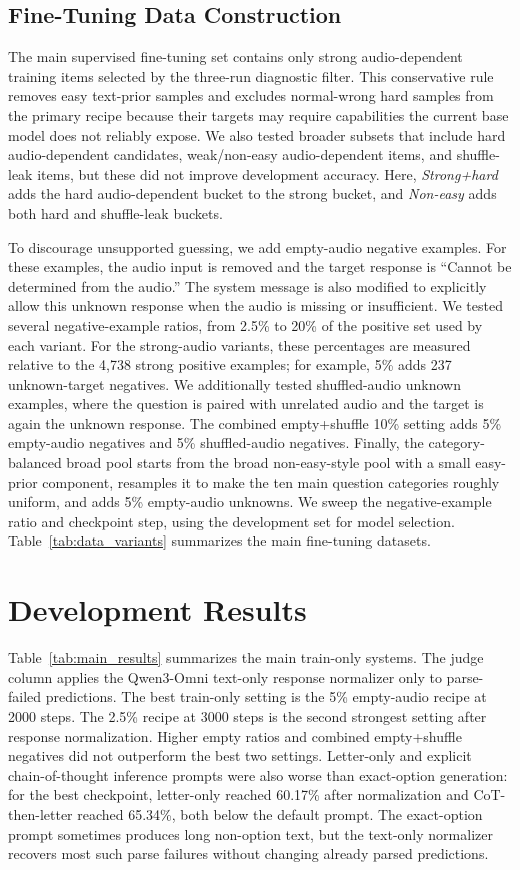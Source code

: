 \documentclass{article}
\begin{document}
\subsection{Fine-Tuning Data Construction}

The main supervised fine-tuning set contains only strong audio-dependent training items selected by the three-run diagnostic filter.
This conservative rule removes easy text-prior samples and excludes normal-wrong hard samples from the primary recipe because their targets may require capabilities the current base model does not reliably expose.
We also tested broader subsets that include hard audio-dependent candidates, weak/non-easy audio-dependent items, and shuffle-leak items, but these did not improve development accuracy.
Here, \emph{Strong+hard} adds the hard audio-dependent bucket to the strong bucket, and \emph{Non-easy} adds both hard and shuffle-leak buckets.

To discourage unsupported guessing, we add empty-audio negative examples.
For these examples, the audio input is removed and the target response is ``Cannot be determined from the audio.''
The system message is also modified to explicitly allow this unknown response when the audio is missing or insufficient.
We tested several negative-example ratios, from 2.5\% to 20\% of the positive set used by each variant.
For the strong-audio variants, these percentages are measured relative to the 4,738 strong positive examples; for example, 5\% adds 237 unknown-target negatives.
We additionally tested shuffled-audio unknown examples, where the question is paired with unrelated audio and the target is again the unknown response.
The combined empty+shuffle 10\% setting adds 5\% empty-audio negatives and 5\% shuffled-audio negatives.
Finally, the category-balanced broad pool starts from the broad non-easy-style pool with a small easy-prior component, resamples it to make the ten main question categories roughly uniform, and adds 5\% empty-audio unknowns.
We sweep the negative-example ratio and checkpoint step, using the development set for model selection.
Table~\ref{tab:data_variants} summarizes the main fine-tuning datasets.

\section{Development Results}

\vspace{-10pt}
Table~\ref{tab:main_results} summarizes the main train-only systems.
The judge column applies the Qwen3-Omni text-only response normalizer only to parse-failed predictions.
The best train-only setting is the 5\% empty-audio recipe at 2000 steps.
The 2.5\% recipe at 3000 steps is the second strongest setting after response normalization.
Higher empty ratios and combined empty+shuffle negatives did not outperform the best two settings.
Letter-only and explicit chain-of-thought inference prompts were also worse than exact-option generation: for the best checkpoint, letter-only reached 60.17\% after normalization and CoT-then-letter reached 65.34\%, both below the default prompt.
The exact-option prompt sometimes produces long non-option text, but the text-only normalizer recovers most such parse failures without changing already parsed predictions.
\end{document}
